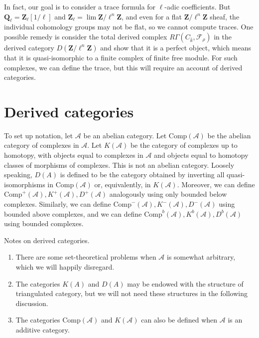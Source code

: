 \medskip\noindent
In fact, our goal is to consider a trace formula for $\ell$-adic coefficients.
But $\mathbf{Q}_\ell = \mathbf{Z}_\ell[1/\ell]$ and $\mathbf{Z}_\ell =
\lim \mathbf{Z}/\ell^n\mathbf{Z}$, and even for a flat
$\mathbf{Z}/\ell^n\mathbf{Z}$ sheaf, the individual cohomology groups may not
be flat, so we cannot compute traces. One possible remedy is consider the total
derived complex $R\Gamma(C_{\bar k}, \mathcal{F}_\rho)$ in the derived category
$D(\mathbf{Z}/\ell^n\mathbf{Z})$ and show that it is a perfect object, which
means that it is quasi-isomorphic to a finite complex of finite free module.
For such complexes, we can define the trace, but this will require an account
of derived categories.






\section{Derived categories}
\label{section-derived-categories}

\noindent
To set up notation, let $\mathcal{A}$ be an abelian category. Let
$\text{Comp}(\mathcal{A})$ be the abelian category of complexes in
$\mathcal{A}$. Let $K(\mathcal{A})$ be the category of complexes up to
homotopy, with objects equal to complexes in $\mathcal{A}$ and objects equal to
homotopy classes of morphisms of complexes. This is not an abelian category.
Loosely speaking, $D(A)$ is defined to be the category obtained by inverting
all quasi-isomorphisms in $\text{Comp}(\mathcal{A})$ or, equivalently, in
$K(\mathcal{A})$. Moreover, we can define $\text{Comp}^+(\mathcal{A}),
K^+(\mathcal{A}), D^+(\mathcal{A})$ analogously using only bounded below
complexes. Similarly, we can define $\text{Comp}^-(\mathcal{A}),
K^-(\mathcal{A}), D^-(\mathcal{A})$ using bounded above complexes, and we can
define $\text{Comp}^b(\mathcal{A}), K^b(\mathcal{A}), D^b(\mathcal{A})$ using
bounded complexes.

\begin{remark}
\label{remarks-derived-categories}
Notes on derived categories.
\begin{enumerate}
\item
There are some set-theoretical problems when $\mathcal{A}$ is somewhat
arbitrary, which we will happily disregard.
\item
The categories $K(A)$ and $D(A)$ may be endowed with the structure of
triangulated category, but we will not need these structures in the following
discussion.
\item
The categories $\text{Comp}(\mathcal{A})$ and $K(\mathcal{A})$ can also be
defined when $\mathcal{A}$ is an additive category.
\end{enumerate}
\end{remark}

